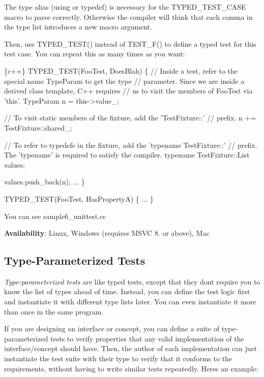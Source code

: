 The type alias ({\ttfamily using} or {\ttfamily typedef}) is necessary for the {\ttfamily T\+Y\+P\+E\+D\+\_\+\+T\+E\+S\+T\+\_\+\+C\+A\+SE} macro to parse correctly. Otherwise the compiler will think that each comma in the type list introduces a new macro argument.

Then, use {\ttfamily T\+Y\+P\+E\+D\+\_\+\+T\+E\+S\+T()} instead of {\ttfamily T\+E\+S\+T\+\_\+\+F()} to define a typed test for this test case. You can repeat this as many times as you want\+:


\begin{DoxyCode}
\{c++\}
TYPED\_TEST(FooTest, DoesBlah) \{
  // Inside a test, refer to the special name TypeParam to get the type
  // parameter.  Since we are inside a derived class template, C++ requires
  // us to visit the members of FooTest via 'this'.
  TypeParam n = this->value\_;

  // To visit static members of the fixture, add the 'TestFixture::'
  // prefix.
  n += TestFixture::shared\_;

  // To refer to typedefs in the fixture, add the 'typename TestFixture::'
  // prefix.  The 'typename' is required to satisfy the compiler.
  typename TestFixture::List values;

  values.push\_back(n);
  ...
\}

TYPED\_TEST(FooTest, HasPropertyA) \{ ... \}
\end{DoxyCode}


You can see sample6\+\_\+unittest.\+cc

{\bfseries Availability}\+: Linux, Windows (requires M\+S\+VC 8. or above), Mac

\subsection*{Type-\/\+Parameterized Tests}

{\itshape Type-\/parameterized tests} are like typed tests, except that they don\textquotesingle{}t require you to know the list of types ahead of time. Instead, you can define the test logic first and instantiate it with different type lists later. You can even instantiate it more than once in the same program.

If you are designing an interface or concept, you can define a suite of type-\/parameterized tests to verify properties that any valid implementation of the interface/concept should have. Then, the author of each implementation can just instantiate the test suite with their type to verify that it conforms to the requirements, without having to write similar tests repeatedly. Here\textquotesingle{}s an example\+:


